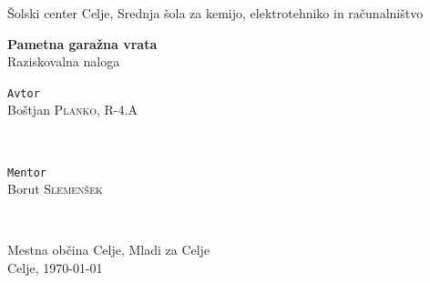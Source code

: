 \documentclass[11pt]{article}
\begin{document}
\renewcommand{\theFancyVerbLine}{
  \sffamily\textcolor[rgb]{0.5,0.5,0.5}{\scriptsize\arabic{FancyVerbLine}}}
\begin{titlepage}
\thispagestyle{empty}
   \center
   \fancyhead{}
   \large{Šolski center Celje, Srednja šola za kemijo, elektrotehniko in računalništvo}\\[1.5cm]
   \vspace*{\fill}
   \begin{center}
   \Huge{\bfseries Pametna garažna vrata}\\
   \vspace{1mm}
   \large{Raziskovalna naloga}
   \end{center}
   \vspace*{\fill}

	\begin{minipage}{0.4\textwidth}
		\begin{flushleft}
		\vspace{4.5mm}
			\large
			\texttt{Avtor}\\
			Boštjan \textsc{Planko}, R-4.A \\ %
		\end{flushleft}
	\end{minipage}
	~
	\begin{minipage}{0.5\textwidth}
		\begin{flushright}
			\large
			\texttt{Mentor}\\
			Borut \textsc{Slemenšek} %
		\end{flushright}
	\end{minipage}
	~
	\begin{minipage}{0.5\textwidth}
		\begin{center}
		    \vspace{5mm}
		    Mestna občina Celje, Mladi za Celje\\
			\large{Celje, \monthyeardate\today}
		\end{center}
	\end{minipage}
	\fancyfoot{}
\end{titlepage}
\end{document}
